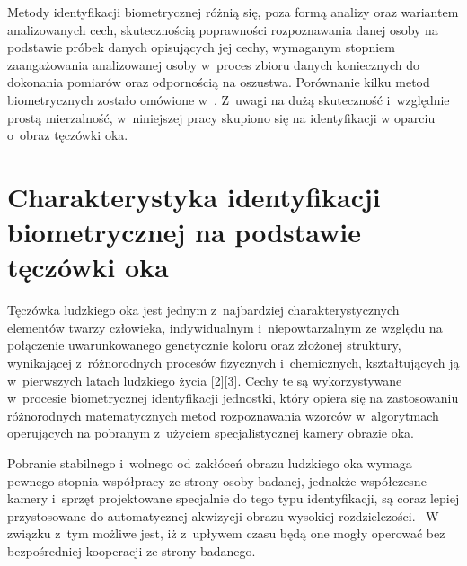 Metody identyfikacji biometrycznej różnią się, poza formą analizy oraz wariantem analizowanych cech, skutecznością poprawności rozpoznawania danej osoby na podstawie próbek danych opisujących jej cechy, wymaganym stopniem zaangażowania analizowanej osoby w~proces zbioru danych koniecznych do dokonania pomiarów oraz odpornością na oszustwa. Porównanie kilku metod biometrycznych zostało omówione w~\cite{Gl11}. Z~uwagi na dużą skuteczność i~względnie prostą mierzalność, w~niniejszej pracy skupiono się na identyfikacji w oparciu o~obraz tęczówki oka.



\section{Charakterystyka identyfikacji biometrycznej na podstawie tęczówki oka}
\label{sec:zawartoscPracy}

Tęczówka ludzkiego oka jest jednym z~najbardziej charakterystycznych elementów twarzy człowieka, indywidualnym i~niepowtarzalnym ze względu na połączenie uwarunkowanego genetycznie koloru oraz złożonej struktury, wynikającej z~różnorodnych procesów fizycznych i~chemicznych, kształtujących ją w~pierwszych latach ludzkiego życia [2][3]. Cechy te są wykorzystywane w~procesie biometrycznej identyfikacji jednostki, który opiera się na zastosowaniu różnorodnych matematycznych metod rozpoznawania wzorców w~algorytmach operujących na pobranym z~użyciem specjalistycznej kamery obrazie oka.

Pobranie stabilnego i~wolnego od zakłóceń obrazu ludzkiego oka wymaga pewnego stopnia współpracy ze strony osoby badanej, jednakże współczesne kamery i~sprzęt projektowane specjalnie do tego typu identyfikacji, są  coraz lepiej przystosowane do automatycznej akwizycji obrazu wysokiej rozdzielczości. ~W związku z~tym możliwe jest, iż z~upływem czasu będą one mogły operować bez bezpośredniej kooperacji ze strony badanego.

